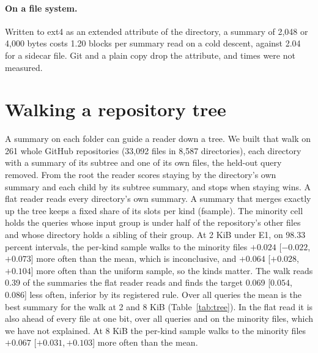 \documentclass[sigconf,natbib=true,anonymous=true]{acmart}
\newcommand{\ci}[2]{[\ensuremath{#1},\,\ensuremath{#2}]}  %
\begin{document}
\paragraph{On a file system.} Written to ext4 as an extended attribute of the directory, a summary of 2,048 or 4,000 bytes costs 1.20 blocks per summary read on a cold descent, against 2.04 for a sidecar file. Git and a plain copy drop the attribute, and times were not measured.

\section{Walking a repository tree}
\label{sec:tree}

A summary on each folder can guide a reader down a tree. We built that walk on 261 whole GitHub repositories (33,092 files in 8,587 directories), each directory with a summary of its subtree and one of its own files, the held-out query removed. From the root the reader scores staying by the directory's own summary and each child by its subtree summary, and stops when staying wins. A flat reader reads every directory's own summary. A summary that merges exactly up the tree keeps a fixed share of its slots per kind (fsample). The minority cell holds the queries whose input group is under half of the repository's other files and whose directory holds a sibling of their group. At 2 KiB under E1, on 98.33 percent intervals, the per-kind sample walks to the minority files $+0.024$ \ci{-0.022}{+0.073} more often than the mean, which is inconclusive, and $+0.064$ \ci{+0.028}{+0.104} more often than the uniform sample, so the kinds matter. The walk reads 0.39 of the summaries the flat reader reads and finds the target 0.069 \ci{0.054}{0.086} less often, inferior by its registered rule. Over all queries the mean is the best summary for the walk at 2 and 8 KiB (Table~\ref{tab:tree}). In the flat read it is also ahead of every file at one bit, over all queries and on the minority files, which we have not explained. At 8 KiB the per-kind sample walks to the minority files $+0.067$ \ci{+0.031}{+0.103} more often than the mean.
\end{document}
